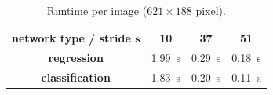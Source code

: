 \begin{table}[]
    \begin{center}
        \begin{tabular}{c|ccc}
            \toprule
            \textbf{network type / stride $\bm{s}$} & 10 & 37 & 51 \\
            \midrule
            \textbf{regression}     & \SI{1.99}{\second} & \SI{0.29}{\second} & \SI{0.18}{\second} \\
            \textbf{classification} & \SI{1.83}{\second} & \SI{0.20}{\second}  & \SI{0.11}{\second}\\
            \bottomrule
        \end{tabular}
        \caption{Runtime per image ($621 \times 188$ pixel).}%
\label{tab:runtime}
    \end{center}
\end{table}

